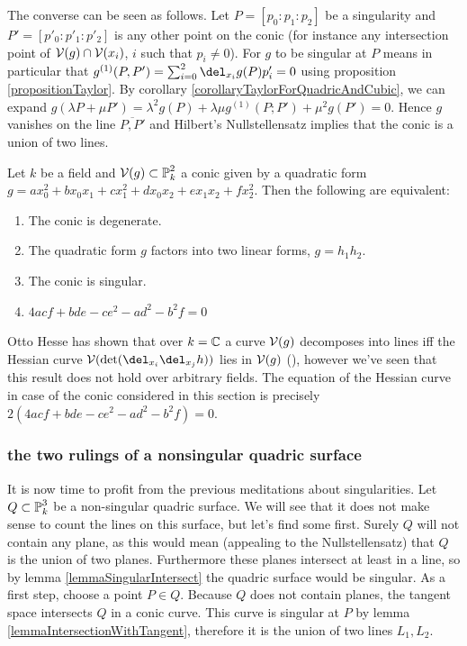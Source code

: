 The converse can be seen as follows. Let $P=[p_0:p_1:p_2]$ be a singularity and $P'=[p'_0:p'_1:p'_2]$ is any other point on the conic (for instance any intersection point of $\operatorname{\mathcal V}(g) \cap \operatorname{\mathcal V}(x_i)$, $i$ such that $p_i \neq 0$).
For $g$ to be singular at $P$ means in particular that $g^{(1)}(P,P') = \sum_{i=0}^2 \del_{x_i}g(P)p'_i = 0$ using proposition \ref{propositionTaylor}.
By corollary \ref{corollaryTaylorForQuadricAndCubic}, we can expand $g(\lambda P + \mu P') = \lambda^2 g(P) + \lambda\mu g^{(1)}(P;P') + \mu^2 g(P')= 0$.
Hence $g$ vanishes on the line $\overline{P,P'}$ and Hilbert's Nullstellensatz implies that the conic is a union of two lines.

\begin{theorem}
Let $k$ be a field and $\operatorname{\mathcal V}(g) \subset \operatorname{\mathbb P}^2_k$ a conic given by a quadratic form $g = ax_0^2 + bx_0x_1 + cx_1^2 + dx_0x_2 + ex_1x_2 + fx_2^2$.
Then the following are equivalent:
\begin{enumerate}
\item The conic is degenerate.
\item The quadratic form $g$ factors into two linear forms, $g=h_1h_2$.
\item The conic is singular.
\item $4acf + bde - ce^2 - ad^2 - b^2f = 0$
\end{enumerate}
\end{theorem}


\begin{remark}
Otto Hesse has shown that over $k=\operatorname{\mathbb C}$ a curve $\operatorname{\mathcal V}(g)$ decomposes into lines iff the Hessian curve $\V(\det(\del_{x_i}\del_{x_j}h))$ lies in $\operatorname{\mathcal V}(g)$ (\cite[p.289]{brieskorn2012plane}), however we've seen that this result does not hold over arbitrary fields.
The equation of the Hessian curve in case of the conic considered in this section is precisely $2(4acf + bde - ce^2 - ad^2 - b^2f) = 0$.
\end{remark}


\subsubsection{the two rulings of a nonsingular quadric surface}


It is now time to profit from the previous meditations about singularities.
Let $Q \subset \operatorname{\mathbb P}^3_k$ be a non-singular quadric surface.
We will see that it does not make sense to count the lines on this surface, but let's find some first.
Surely $Q$ will not contain any plane, as this would mean (appealing to the Nullstellensatz) that $Q$ is the union of two planes.
Furthermore these planes intersect at least in a line, so by lemma \ref{lemmaSingularIntersect} the quadric surface would be singular.
As a first step, choose a point $P \in Q$.
Because $Q$ does not contain planes, the tangent space intersects $Q$ in a conic curve.
This curve is singular at $P$ by lemma \ref{lemmaIntersectionWithTangent}, therefore it is the union of two lines $L_1,L_2$.

